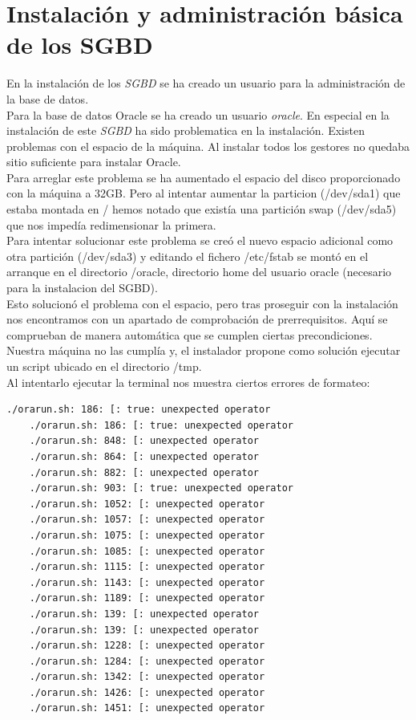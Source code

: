 \documentclass{article}
\begin{document}
\section{Instalación y administración básica de los SGBD}

En la instalación de los \emph{SGBD} se ha creado un usuario para la administración de la base de datos.\\
Para la base de datos Oracle se ha creado un usuario \emph{oracle}. En especial en la instalación de este \emph{SGBD} ha sido problematica en la instalación. Existen problemas con el espacio de la máquina. Al instalar todos los gestores no quedaba sitio suficiente para instalar Oracle.\\
Para arreglar este problema se ha aumentado el espacio del disco proporcionado con la máquina a 32GB. Pero al intentar aumentar la particion (/dev/sda1)
que estaba montada en / hemos notado que existía una partición swap (/dev/sda5) que nos impedía redimensionar la primera.\\
Para intentar solucionar este problema se creó el nuevo espacio adicional como otra partición (/dev/sda3) y editando el fichero /etc/fstab se montó en el arranque
en el directorio /oracle, directorio home del usuario oracle (necesario para la instalacion del SGBD).\\
Esto solucionó el problema con el espacio, pero tras proseguir con la instalación nos encontramos con un apartado de comprobación de prerrequisitos. Aquí se comprueban
de manera automática que se cumplen ciertas precondiciones. Nuestra máquina no las cumplía y, el instalador propone como solución ejecutar un script ubicado en el directorio
/tmp.\\
Al intentarlo ejecutar la terminal nos muestra ciertos errores de formateo:

\begin{lstlisting}[language=bash]
	./orarun.sh: 186: [: true: unexpected operator
	./orarun.sh: 186: [: true: unexpected operator
	./orarun.sh: 848: [: unexpected operator
	./orarun.sh: 864: [: unexpected operator
	./orarun.sh: 882: [: unexpected operator
	./orarun.sh: 903: [: true: unexpected operator
	./orarun.sh: 1052: [: unexpected operator
	./orarun.sh: 1057: [: unexpected operator
	./orarun.sh: 1075: [: unexpected operator
	./orarun.sh: 1085: [: unexpected operator
	./orarun.sh: 1115: [: unexpected operator
	./orarun.sh: 1143: [: unexpected operator
	./orarun.sh: 1189: [: unexpected operator
	./orarun.sh: 139: [: unexpected operator
	./orarun.sh: 139: [: unexpected operator
	./orarun.sh: 1228: [: unexpected operator
	./orarun.sh: 1284: [: unexpected operator
	./orarun.sh: 1342: [: unexpected operator
	./orarun.sh: 1426: [: unexpected operator
	./orarun.sh: 1451: [: unexpected operator
\end{lstlisting}
\end{document}

